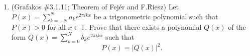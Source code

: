 \documentclass[a4paper]{article}
\begin{document}
\begin{enumerate}
\begin{proof}
\begin{enumerate}
    \item
    We start with the Dirichlet kernel. For $D_N(x)$, we easily see that
    \[
      \hat{D}_N (k) =
      \begin{cases}
        1 &\text{if } |k| \leq N \\
        0 &\text{else}
      \end{cases}
    \]

    By linearity, we find the Fourier coefficients of $F_N$ are given by
    \begin{align*}
      \hat{F}_N (k) &= \frac{1}{N+1} \sum_{n=0}^N \hat{D}_n (k) \\
      &= \begin{cases}
        1 - \frac{k+1}{N+1} &\text{if } |k| \leq N \\
        0 &\text{else}
        \end{cases}
    \end{align*}

    Then
    \begin{align*}
      \hat{V}_N(k) &= 2 \hat{F}_{2N+1}(k) - \hat{F}_N (k) \\
      &= \begin{cases}
        \left( 2 - \frac{2(k+1)}{2(N+1)} \right) - \left( 1 - \frac{k+1}{N+1} \right) &\text{if } |k| \leq N \\
        2 - \frac{2(k+1)}{2(N+1)} &\text{if } N < |k| \leq 2N+1 \\
        0 &\text{else}
      \end{cases} \\
      &= \begin{cases}
        1 &\text{if } |k| \leq N \\
        2 - \frac{k+1}{N+1} &\text{if } N < |k| \leq 2N+1 \\
        0 &\text{else}
      \end{cases}
    \end{align*}

  \end{enumerate}

  \end{proof}

  \vspace{6cm}

\item  (Grafakos \#3.1.11; Theorem of Fej\'er and F.\~Riesz)  Let $\displaystyle{ P(x) = \sum_{k=-N}^N a_k e^{2\pi i k x} }$ be a trigonometric polynomial such that $ P(x) > 0$ for all $x\in \mathbb T$. Prove that there exists a polynomial  $Q(x)$ of the form  $\displaystyle{ Q(x) = \sum_{k=0}^N b_k e^{2\pi i k x} }$ such that $$P (x) = | Q(x) |^2 . $$


\end{enumerate}
\end{document}
